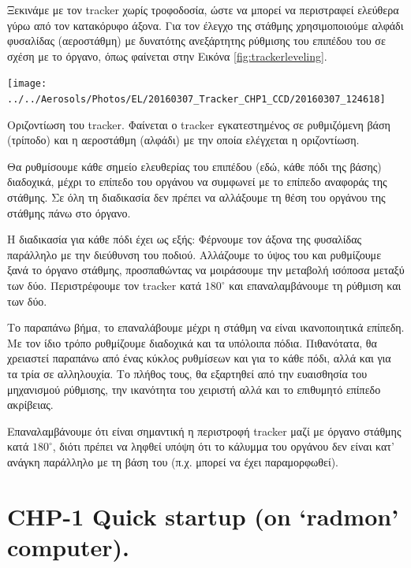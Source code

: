 \documentclass[
  a4paper,
  twoside,
  titlepage,
  11pt]{article}
\numberwithin{equation}{section}
\numberwithin{figure}{section}
\numberwithin{table}{section}
\begin{document}
Ξεκινάμε με τον tracker χωρίς τροφοδοσία, ώστε να μπορεί να περιστραφεί ελεύθερα γύρω από τον κατακόρυφο άξονα. Για τον έλεγχο της στάθμης χρησιμοποιούμε αλφάδι φυσαλίδας (αεροστάθμη) με δυνατότης ανεξάρτητης ρύθμισης του επιπέδου του σε σχέση με το όργανο, όπως φαίνεται στην Εικόνα \ref{fig:trackerleveling}.

\begin{img}

{\centering \texttt{[image: ../../Aerosols/Photos/EL/20160307\_Tracker\_CHP1\_CCD/20160307\_124618]} 

}

\caption{Οριζοντίωση του tracker. Φαίνεται ο tracker εγκατεστημένος σε ρυθμιζόμενη βάση (τρίποδο) και η αεροστάθμη (αλφάδι) με την οποία ελέγχεται η οριζοντίωση.}\label{fig:trackerleveling}
\end{img}

Θα ρυθμίσουμε κάθε σημείο ελευθερίας του επιπέδου (εδώ, κάθε πόδι της βάσης) διαδοχικά, μέχρι το επίπεδο του οργάνου να συμφωνεί με το επίπεδο αναφοράς της στάθμης. Σε όλη τη διαδικασία δεν πρέπει να αλλάξουμε τη θέση του οργάνου της στάθμης πάνω στο όργανο.

Η διαδικασία για κάθε πόδι έχει ως εξής:
Φέρνουμε τον άξονα της φυσαλίδας παράλληλο με την διεύθυνση του ποδιού. Αλλάζουμε το ύψος του και ρυθμίζουμε ξανά το όργανο στάθμης, προσπαθώντας να μοιράσουμε την μεταβολή ισόποσα μεταξύ των δύο. Περιστρέφουμε τον tracker κατά \(180^\circ\) και επαναλαμβάνουμε τη ρύθμιση και των δύο.

Το παραπάνω βήμα, το επαναλάβουμε μέχρι η στάθμη να είναι ικανοποιητικά επίπεδη. Με τον ίδιο τρόπο ρυθμίζουμε διαδοχικά και τα υπόλοιπα πόδια. Πιθανότατα, θα χρειαστεί παραπάνω από ένας κύκλος ρυθμίσεων και για το κάθε πόδι, αλλά και για τα τρία σε αλληλουχία. Το πλήθος τους, θα εξαρτηθεί από την ευαισθησία του μηχανισμού ρύθμισης, την ικανότητα του χειριστή αλλά και το επιθυμητό επίπεδο ακρίβειας.

Επαναλαμβάνουμε ότι είναι σημαντική η περιστροφή tracker μαζί με όργανο στάθμης κατά \(180^\circ\), διότι πρέπει να ληφθεί υπόψη ότι το κάλυμμα του οργάνου δεν είναι κατ' ανάγκη παράλληλο με τη βάση του (π.χ. μπορεί να έχει παραμορφωθεί).

\newpage

\appendix

\hypertarget{chp-1-quick-startup-on-radmon-computer.}{%
\section{CHP-1 Quick startup (on `radmon' computer).}\label{chp-1-quick-startup-on-radmon-computer.}}
\end{document}
